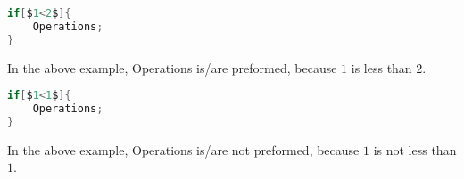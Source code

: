 \begin{itemize}
\begin{itemize}
\begin{lstlisting}[language=C,caption=Less Than Example 1,label=lst:ltex1]
if[$1<2$]{
	Operations;
}
\end{lstlisting}
\begin{center}
In the above example, Operations is/are preformed, because $1$ is less than $2$.
\end{center}
\begin{lstlisting}[language=C,caption=Less Than Example 2,label=lst:ltex2]
if[$1<1$]{
	Operations;
}
\end{lstlisting}
\begin{center}
In the above example, Operations is/are not preformed, because $1$ is not less than $1$.
\end{center}
\end{itemize}
\end{itemize}

